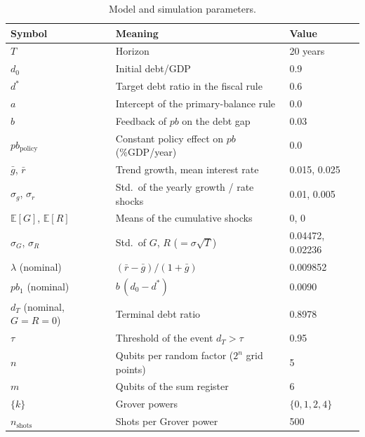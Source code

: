 \documentclass[pdflatex,sn-mathphys-num]{sn-jnl}%
\theoremstyle{thmstyleone}%
\theoremstyle{thmstyletwo}%
\theoremstyle{thmstylethree}%
\begin{document}
\begin{table}[h!]
\centering
\caption{Model and simulation parameters.}\label{tab:params}
\begin{tabular}{lll}
\toprule
\textbf{Symbol} & \textbf{Meaning} & \textbf{Value} \\ \midrule
$T$ & Horizon & 20 years \\
$d_0$ & Initial debt/GDP & 0.9 \\
$d^{*}$ & Target debt ratio in the fiscal rule & 0.6 \\
$a$ & Intercept of the primary-balance rule & 0.0 \\
$b$ & Feedback of $pb$ on the debt gap & 0.03 \\
$pb_{\mathrm{policy}}$ & Constant policy effect on $pb$ (\%GDP/year) & 0.0 \\
$\bar g$, $\bar r$ & Trend growth, mean interest rate & 0.015, 0.025 \\
$\sigma_g$, $\sigma_r$ & Std.\ of the yearly growth / rate shocks & 0.01, 0.005 \\
$\mathbb E[G]$, $\mathbb E[R]$ & Means of the cumulative shocks & 0, 0 \\
$\sigma_G$, $\sigma_R$ & Std.\ of $G$, $R$ ($=\sigma\sqrt T$) & 0.04472, 0.02236 \\
$\lambda$ (nominal) & $(\bar r-\bar g)/(1+\bar g)$ & 0.009852 \\
$pb_1$ (nominal) & $b\,(d_0-d^{*})$ & 0.0090 \\
$d_T$ (nominal, $G=R=0$) & Terminal debt ratio & 0.8978 \\
$\tau$ & Threshold of the event $d_T>\tau$ & 0.95 \\
$n$ & Qubits per random factor ($2^n$ grid points) & 5 \\
$m$ & Qubits of the sum register & 6 \\
$\{k\}$ & Grover powers & $\{0,1,2,4\}$ \\
$n_{\mathrm{shots}}$ & Shots per Grover power & 500 \\
\bottomrule
\end{tabular}
\end{table}
\end{document}
